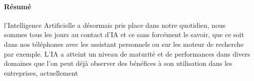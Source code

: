 \paragraph{Résumé}
l'Intelligence Artificielle a désormais pris place dans notre quotidien, 
nous sommes tous les jours au contact
d'IA et ce sans forcément le savoir, que ce soit dans nos téléphones 
avec les assistant personnels ou sur les moteur de recherche par exemple. \newline
L'IA a atteint un niveau de maturité et de performances dans divers domaines que l'on peut 
déjà observer des bénéfices à son utilisation dans les entreprises, 
actuellement 
